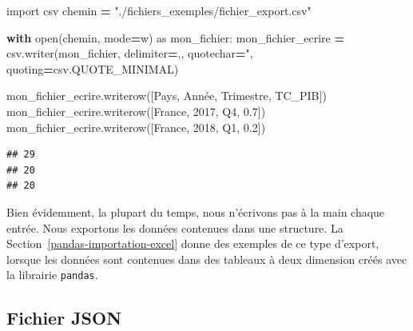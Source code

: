 \documentclass[
  12pt,
]{book}
\newenvironment{Shaded}{\begin{snugshade}}{\end{snugshade}}
\newcommand{\BuiltInTok}[1]{#1}
\newcommand{\ControlFlowTok}[1]{\textcolor[rgb]{0.13,0.29,0.53}{\textbf{#1}}}
\newcommand{\FloatTok}[1]{\textcolor[rgb]{0.00,0.00,0.81}{#1}}
\newcommand{\ImportTok}[1]{#1}
\newcommand{\NormalTok}[1]{#1}
\newcommand{\OperatorTok}[1]{\textcolor[rgb]{0.81,0.36,0.00}{\textbf{#1}}}
\newcommand{\StringTok}[1]{\textcolor[rgb]{0.31,0.60,0.02}{#1}}
\numberwithin{equation}{section}
\numberwithin{countremarque}{section}
\begin{document}
\begin{Shaded}
\begin{Highlighting}[]
\ImportTok{import}\NormalTok{ csv}
\NormalTok{chemin }\OperatorTok{=} \StringTok{"./fichiers\_exemples/fichier\_export.csv"}

\ControlFlowTok{with} \BuiltInTok{open}\NormalTok{(chemin, mode}\OperatorTok{=}\StringTok{\textquotesingle{}w\textquotesingle{}}\NormalTok{) }\ImportTok{as}\NormalTok{ mon\_fichier:}
\NormalTok{    mon\_fichier\_ecrire }\OperatorTok{=}\NormalTok{ csv.writer(mon\_fichier, delimiter}\OperatorTok{=}\StringTok{\textquotesingle{},\textquotesingle{}}\NormalTok{,}
\NormalTok{                                    quotechar}\OperatorTok{=}\StringTok{\textquotesingle{}"\textquotesingle{}}\NormalTok{,}
\NormalTok{                                    quoting}\OperatorTok{=}\NormalTok{csv.QUOTE\_MINIMAL)}

\NormalTok{    mon\_fichier\_ecrire.writerow([}\StringTok{\textquotesingle{}Pays\textquotesingle{}}\NormalTok{, }\StringTok{\textquotesingle{}Année\textquotesingle{}}\NormalTok{, }\StringTok{\textquotesingle{}Trimestre\textquotesingle{}}\NormalTok{, }\StringTok{\textquotesingle{}TC\_PIB\textquotesingle{}}\NormalTok{])}
\NormalTok{    mon\_fichier\_ecrire.writerow([}\StringTok{\textquotesingle{}France\textquotesingle{}}\NormalTok{, }\StringTok{\textquotesingle{}2017\textquotesingle{}}\NormalTok{, }\StringTok{\textquotesingle{}Q4\textquotesingle{}}\NormalTok{, }\FloatTok{0.7}\NormalTok{])}
\NormalTok{    mon\_fichier\_ecrire.writerow([}\StringTok{\textquotesingle{}France\textquotesingle{}}\NormalTok{, }\StringTok{\textquotesingle{}2018\textquotesingle{}}\NormalTok{, }\StringTok{\textquotesingle{}Q1\textquotesingle{}}\NormalTok{, }\FloatTok{0.2}\NormalTok{])}
\end{Highlighting}
\end{Shaded}

\begin{lstlisting}
## 29
## 20
## 20
\end{lstlisting}

Bien évidemment, la plupart du temps, nous n'écrivons pas à la main chaque entrée. Nous exportons les données contenues dans une structure. La Section~\ref{pandas-importation-excel} donne des exemples de ce type d'export, lorsque les données sont contenues dans des tableaux à deux dimension créés avec la librairie \texttt{pandas}.

\subsection{Fichier JSON}\label{fichier-json-1}
\end{document}
